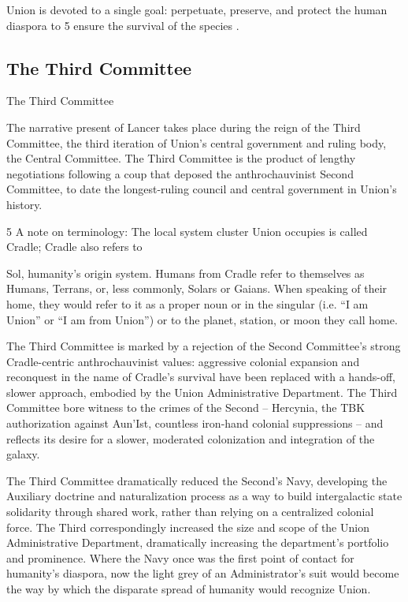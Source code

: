 Union is devoted to a single goal: perpetuate, preserve, and protect the human diaspora to  
                                        5 
ensure the survival of the species  .
 
\subsection{The Third Committee}
The Third Committee  

The narrative present of Lancer takes place during the reign of the Third Committee, the third  
iteration of Union’s central government and ruling body, the Central Committee. The Third  
Committee is the product of lengthy negotiations following a coup that deposed the  
anthrochauvinist Second Committee, to date the longest-ruling council and central government in  
Union’s history.   

5 A note on terminology: The local system cluster Union occupies is called Cradle; Cradle also refers to  

Sol, humanity’s origin system. Humans from Cradle refer to themselves as Humans, Terrans, or, less  
commonly, Solars or Gaians. When speaking of their home, they would refer to it as a proper noun or in the  
singular (i.e. “I am Union” or “I am from Union”) or to the planet, station, or moon they call home. 

                                                                                                                 


The Third Committee is marked by a rejection of the Second Committee’s strong Cradle-centric  
anthrochauvinist values: aggressive colonial expansion and reconquest in the name of Cradle’s  
survival have been replaced with a hands-off, slower approach, embodied by the Union  
Administrative Department. The Third Committee bore witness to the crimes of the Second --  
Hercynia, the TBK authorization against Aun’Ist, countless iron-hand colonial suppressions -- and  
reflects its desire for a slower, moderated colonization and integration of the galaxy.   

The Third Committee dramatically reduced the Second’s Navy, developing the Auxiliary doctrine  
and naturalization process as a way to build intergalactic state solidarity through shared work,  
rather than relying on a centralized colonial force. The Third correspondingly increased the size  
and scope of the Union Administrative Department, dramatically increasing the department’s  
portfolio and prominence. Where the Navy once was the first point of contact for humanity’s  
diaspora, now the light grey of an Administrator’s suit would become the way by which the  
disparate spread of humanity would recognize Union.   

